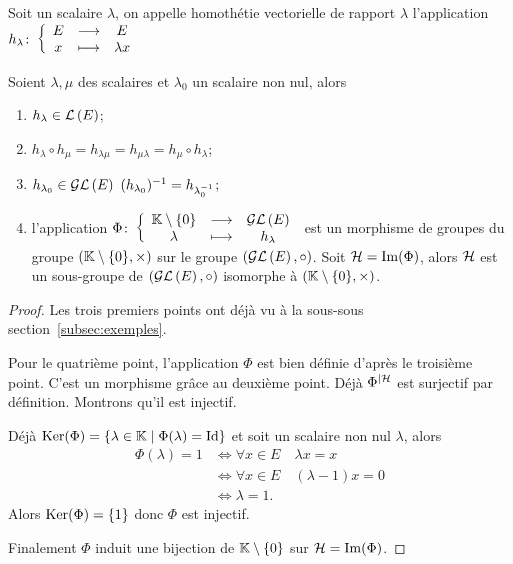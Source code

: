 \begin{defdef}
  Soit un scalaire \(\lambda\), on appelle homothétie vectorielle de rapport 
  \(\lambda\) l'application \(h_\lambda\colon\left\{\begin{array}{ccc}E & \longrightarrow &E\\x & \longmapsto & \lambda x\end{array}\right.\)
\end{defdef}

\begin{prop}
  Soient \(\lambda, \mu\) des scalaires et \(\lambda_0\) un scalaire non nul, 
  alors
  \begin{enumerate}
    \item \(h_\lambda \in \mathcal{L}\left(E\right)\);
    \item \(h_\lambda \circ h_\mu = h_{\lambda \mu} = h_{\mu \lambda} = h_\mu 
      \circ h_\lambda\);
    \item \(h_{\lambda_0} \in \GL{E} \ 
      (h_{\lambda_0})^{-1}=h_{\lambda_0^{-1}}\);
    \item l'application 
      \(\Phi\colon\left\{\begin{array}{ccc}\mathbb{K}\setminus\{0\} & \longrightarrow &\mathcal{GL}\left(E\right)\\\lambda & \longmapsto & h_\lambda\end{array}\right.\) est un 
      morphisme de groupes du groupe \((\mathbb{K}\setminus\{0\}, \times)\) sur le 
      groupe \((\mathcal{GL}\left(E\right), \circ)\). Soit \(\mathcal{H}=\operatorname{Im}(\Phi)\), alors \(\mathcal{H}\) est un 
      sous-groupe de \((\mathcal{GL}\left(E\right), \circ)\) isomorphe à \((\mathbb{K}\setminus\{0\}, 
      \times)\).
  \end{enumerate}

\end{prop}

\begin{proof}
  Les trois premiers points ont déjà vu à la sous-sous section~\ref{subsec:exemples}.

  Pour le quatrième point, l'application \(\Phi\) est bien définie d'après le 
  troisième point. C'est un morphisme grâce au deuxième point. Déjà 
  \(\Phi^{|\mathcal{H}}\) est surjectif par définition. Montrons qu'il est injectif.

  Déjà \(\operatorname{Ker}(\Phi)=\left\{\lambda \in \mathbb{K}\mathrel{}\middle|\mathrel{}\Phi(\lambda)=\operatorname{Id}\right\}\) et soit un 
  scalaire non nul \(\lambda\), alors
  \begin{align}
    \Phi(\lambda) = 1 &\iff \forall x \in E \quad \lambda x=x\\
    &\iff \forall x \in E \quad (\lambda-1)x=0\\
    &\iff \lambda=1.
  \end{align}
  Alors  \(\operatorname{Ker}(\Phi)=\{1\}\) donc \(\Phi\) est injectif.

  Finalement \(\Phi\) induit une bijection de \(\mathbb{K}\setminus\{0\}\) sur 
  \(\mathcal{H}=\operatorname{Im}(\Phi)\).
\end{proof}

